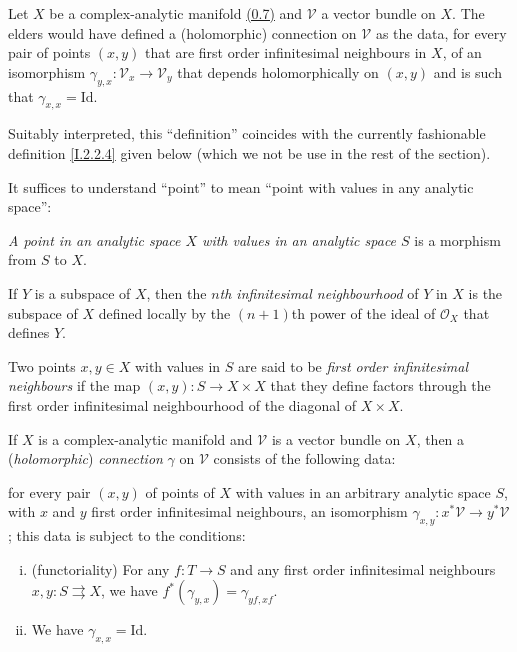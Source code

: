 \documentclass{report}
\theoremstyle{plain}
\theoremstyle{definition}
\newenvironment{env}[1]
    {\renewcommand\theinnercustomenv{#1}\innercustomenv}
    {\endinnercustomenv}
\newcommand{\sh}{\mathscr}
\newcommand{\id}{\mathrm{Id}}
\newcommand{\oldpage}[1]{\marginpar{\footnotesize$\Big\vert$ \textit{p.~#1}}}
\begin{document}
\begin{env}{2.2}
\label{I.2.2}
  Let $X$ be a complex-analytic manifold \hyperref[0.7]{(0.7)} and $\sh{V}$ a vector bundle on $X$.
  The elders would have defined a (holomorphic) connection on $\sh{V}$ as the data, for every pair of points $(x,y)$ that are first order infinitesimal neighbours in $X$, of an isomorphism $\gamma_{y,x}\colon\sh{V}_x\to\sh{V}_y$ that depends holomorphically on $(x,y)$ and is such that $\gamma_{x,x}=\id$.

  Suitably interpreted, this ``definition'' coincides with the currently fashionable definition \cref{I.2.2.4} given below (which we not be use in the rest of the section).

  It suffices to understand ``point'' to mean ``point with values in any analytic space'':

\oldpage{6}
  \begin{env}{2.2.1}
  \label{I.2.2.1}
    \emph{A point in an analytic space $X$ with values in an analytic space $S$} is a morphism from $S$ to $X$.
  \end{env}

  \begin{env}{2.2.2}
  \label{I.2.2.2}
    If $Y$ is a subspace of $X$, then the \emph{$n$th infinitesimal neighbourhood} of $Y$ in $X$ is the subspace of $X$ defined locally by the $(n+1)$th power of the ideal of $\sh{O}_X$ that defines $Y$.
  \end{env}

  \begin{env}{2.2.3}
  \label{I.2.2.3}
    Two points $x,y\in X$ with values in $S$ are said to be \emph{first order infinitesimal neighbours} if the map $(x,y)\colon S\to X\times X$ that they define factors through the first order infinitesimal neighbourhood of the diagonal of $X\times X$.
  \end{env}

  \begin{env}{2.2.4}
  \label{I.2.2.4}
    If $X$ is a complex-analytic manifold and $\sh{V}$ is a vector bundle on $X$, then a (\emph{holomorphic}) \emph{connection} $\gamma$ on $\sh{V}$ consists of the following data:

    for every pair $(x,y)$ of points of $X$ with values in an arbitrary analytic space $S$, with $x$ and $y$ first order infinitesimal neighbours, an isomorphism $\gamma_{x,y}\colon x^*\sh{V}\to y^*\sh{V}$;
    this data is subject to the conditions:
    \begin{enumerate}[(i)]
      \item (functoriality) For any $f\colon T\to S$ and any first order infinitesimal neighbours $x,y\colon S\rightrightarrows X$, we have $f^*(\gamma_{y,x})=\gamma_{yf,xf}$.
      \item We have $\gamma_{x,x}=\id$.
    \end{enumerate}
  \end{env}
\end{env}
\end{document}
